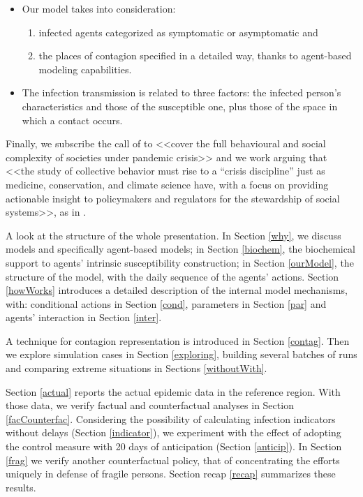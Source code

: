 \documentclass[graybox]{svmult}
\begin{document}
\begin{itemize}

\item

Our model takes into consideration: 

\begin{enumerate}[label=\roman*]
\item infected agents categorized as symptomatic or asymptomatic and 
\item the places of contagion specified in a detailed way, thanks to agent-based modeling capabilities. 
\end{enumerate}

 \item
The infection transmission is related to three factors: the infected person's characteristics and those of the susceptible one, plus those of the space in which a contact occurs.

\end{itemize}


Finally, we subscribe the call of \cite{squazzoni2020} to <<cover the full behavioural and social complexity of societies under pandemic crisis>> and we work arguing that <<the study of collective behavior must rise to a ``crisis discipline'' just as medicine, conservation, and climate science have, with a focus on providing actionable insight to policymakers and regulators for the stewardship of social systems>>, as in \cite{Bak-Colemane2025764118}. 

A look at the structure of the whole presentation.
In Section \ref{why}, we discuss models and specifically agent-based models; in Section \ref{biochem}, the biochemical support to agents' intrinsic susceptibility construction; in Section \ref{ourModel}, the structure of the model, with the daily sequence of the agents' actions. Section \ref{howWorks} introduces a detailed description of the internal model mechanisms, with: conditional actions in Section \ref{cond}, parameters in Section \ref{par} and agents' interaction in Section \ref{inter}.

A technique for contagion representation is introduced in Section \ref{contag}. Then we explore simulation cases in Section \ref{exploring}, building several batches of runs and comparing extreme situations in Sections \ref{withoutWith}.

Section \ref{actual} reports the actual epidemic data in the reference region. With those data, we verify factual and counterfactual analyses in Section \ref{facCounterfac}. Considering the possibility of calculating infection indicators without delays (Section \ref{indicator}), we experiment with the effect of adopting the control measure with 20 days of anticipation (Section \ref{anticip}). In Section \ref{frag} we verify another counterfactual policy, that of concentrating the efforts uniquely in defense of fragile persons. Section recap \ref{recap} summarizes these results.
\end{document}

